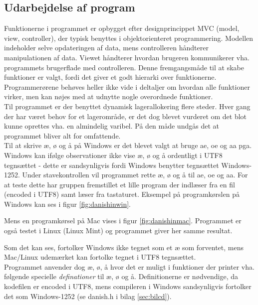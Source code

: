 \subsection{Udarbejdelse af program}
Funktionerne i programmet er opbygget efter designprincippet MVC (model, view, controller), der typisk benyttes i objektorienteret programmering. Modellen indeholder selve opdateringen af data, mens controlleren håndterer manipulationen af data. Viewet håndterer hvordan brugeren kommunikerer vha. programmets brugerflade med controlleren. Denne fremgangsmåde til at skabe funktioner er valgt, fordi det giver et godt hierarki over funktionerne. Programmerørene behøves heller ikke vide i deltaljer om hvordan alle funktioner virker, men kan nøjes med at udnytte nogle overordnede funktioner. \cite{MVC}\\

Til programmet er der benyttet dynamisk lagerallokering flere steder. Hver gang der har været behov for et lagerområde, er det dog blevet vurderet om det blot kunne oprettes vha. en almindelig varibel. På den måde undgås det at programmet bliver alt for omfattende. \\

Til at skrive æ, ø og å på Windows er det blevet valgt at bruge ae, oe og aa pga. Windows kan ifølge observationer ikke vise æ, ø og å ordentligt i UTF8 tegnsættet - dette er sandsynligvis fordi Windows benytter tegnsættet Windows-1252. Under stavekontrollen vil programmet rette æ, ø og å til ae, oe og aa. For at teste dette har gruppen fremstillet et lille program der indlæser fra en fil (encoded i UTF8) samt læser fra tastaturet. Eksempel på programkørslen på Windows kan ses i figur \ref{fig:danishinwin}.
 
Mens en programkørsel på Mac vises i figur \ref{fig:danishinmac}. Programmet er også testet i Linux (Linux Mint) og programmet giver her samme resultat.

Som det kan ses, fortolker Windows ikke tegnet som et æ som forventet, mens Mac/Linux udemærket kan fortolke tegnet i UTF8 tegnsættet.\\

Programmet anvender dog æ, ø, å hvor det er muligt i funktioner der printer vha. følgende specielle \textit{definationer} til æ, ø og å. Definitionerne er nødvendige, da kodefilen er encoded i UTF8, mens compileren i Windows sandsynligvis fortolker det som Windows-1252 (se danish.h i bilag \ref{sec:bilcd}).

